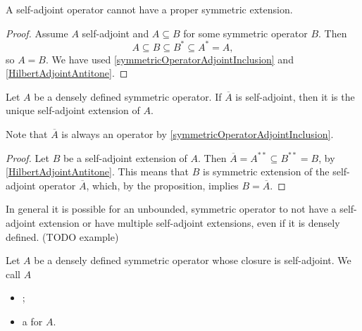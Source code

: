 \begin{proposition} \label{selfAdjointMaximal}
A self-adjoint operator cannot have a proper symmetric extension.
\end{proposition}
\begin{proof}
Assume $A$ self-adjoint and $A\subseteq B$ for some symmetric operator $B$. Then
\[ A \subseteq B \subseteq B^* \subseteq A^* = A, \]
so $A = B$. We have used \ref{symmetricOperatorAdjointInclusion} and \ref{HilbertAdjointAntitone}.
\end{proof}
\begin{corollary}
Let $A$ be a densely defined symmetric operator. If $\overline{A}$ is self-adjoint, then it is the unique self-adjoint extension of $A$.
\end{corollary}
Note that $\overline{A}$ is always an operator by \ref{symmetricOperatorAdjointInclusion}.
\begin{proof}
Let $B$ be a self-adjoint extension of $A$. Then $\overline{A} = A^{**}\subseteq B^{**} = B$, by \ref{HilbertAdjointAntitone}. This means that $B$ is symmetric extension of the self-adjoint operator $\overline{A}$, which, by the proposition, implies $B = \overline{A}$.
\end{proof}
In general it is possible for an unbounded,
symmetric operator to not have a self-adjoint extension or have multiple self-adjoint extensions, even if it is densely defined. (TODO example)

\begin{definition}
Let $A$ be a densely defined symmetric operator whose closure is self-adjoint. We call $A$
\begin{itemize}
\item {};
\item a  for $A$.
\end{itemize}
\end{definition}

